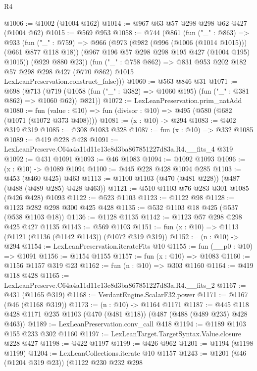 \begin{lexlean}{R4}
\begin{coremodule}
@1006 := @1002 (@1004 @162)
@1014 := @967 @63 @57 @298 @298 @62 @427 (@1004 @62)
@1015 := @569 @953
@1058 := @744
    (@861
      (fun ("_" : @863) =>
      @933
        (fun ("_" : @759) =>
        @966
          (@973
            (@982 (@996 (@1006 (@1014 @1015))) (@661 @877 @118 @18))
            (@967 @196 @57 @298 @298 @195 @427 (@1004 @195) @1015))
          (@929 @880 @23))
        (fun ("_" : @758 @862) =>
        @831
          @953
          @202
          @182
          @57
          @298
          @298
          @427
          (@770 @862)
          @1015
          LexLeanPreservation.construct_false)))
@1060 := @563 @846 @31
@1071 := @698
    (@713 (@719 (@1058 (fun ("_" : @382) => @1060 @195) (fun ("_" : @381 @862) => @1060 @62)) @821))
@1072 := LexLeanPreservation.prim_natAdd
@1080 := fun (value : @10) => fun (divisor : @10) => @495 (@580 (@682 (@1071 (@1072 @373 @408))))
@1081 := (x : @10) -> @294
@1083 := @402 @319 @319
@1085 := @308 @1083 @328
@1087 := fun (x : @10) => @332 @1085
@1089 := @419 @228 @428
@1091 := LexLeanPreserve.C64a4a11d11c13c8d3ba867851227d83a.R4.__fits_4 @319
@1092 := @431 @1091
@1093 := @46 @1083
@1094 := @1092 @1093
@1096 := (x : @10) -> @1089 @1094
@1100 := @445 @228 @428 @1094 @285
@1103 := @453 (@460 @425) @463
@1113 := @1100 @1103 (@470 (@481 @228)) (@487 (@488 (@489 @285) @428 @463))
@1121 := @510 @1103 @76 @283 @301 @1085 (@426 @428) @1093
@1122 := @523 @1103
@1123 := @1122 @98
@1128 := @1123 @282 @298 @300 @425 @428
@1135 := @532 @1103 @18 @425 (@537 (@538 @1103 @18))
@1136 := @1128 @1135
@1142 := @1123 @57 @298 @298 @425 @427 @1135
@1143 := @569 @1103
@1151 := fun (x : @10) => @1113 (@1121 (@1136 (@1142 @1143)) (@1072 @319 @319))
@1152 := (n : @10) -> @294
@1154 := LexLeanPreservation.iterateFits @10
@1155 := fun (__p0 : @10) => @1091
@1156 := @1154 @1155
@1157 := fun (x : @10) => @1083
@1160 := @1156 @1157 @319 @23
@1162 := fun (n : @10) => @303 @1160
@1164 := @419 @118 @428
@1165 := LexLeanPreserve.C64a4a11d11c13c8d3ba867851227d83a.R4.__fits_2
@1167 := @431 (@1165 @319)
@1168 := VerdantEngine.ScalarF32.power
@1171 := @1167 (@46 (@1168 @319))
@1173 := (n : @10) -> @1164 @1171
@1187 := @445 @118 @428 @1171 @235 @1103 (@470 (@481 @118)) (@487 (@488 (@489 @235) @428 @463))
@1189 := LexLeanPreservation.conv_call @418
@1194 := @1189 @1103 @155 @233 @302 @1160
@1197 := LexLeanTarget.TargetSyntax.Value.closure @228 @427
@1198 := @422 @1197
@1199 := @426 @962
@1201 := @1194 (@1198 @1199)
@1204 := LexLeanCollections.iterate @10 @1157
@1243 := @1201
    (@46 (@1204 @319 @23))
    (@1122
      @230
      @232
      @298

\end{coremodule}
\end{lexlean}
